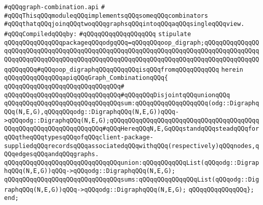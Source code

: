\label{src/lib/graph/graph-combination.api}
\verb|#qQQqgraph-combination.api|\newline
\verb|#|\newline
\verb|#qQQqThisqQQqmoduleqQQqimplementsqQQqsomeqQQqcombinators|\newline
\verb|#qQQqthatqQQqjoinqQQqtwoqQQqgraphsqQQqintoqQQqaqQQqsingleqQQqview.|\newline
\newline
\verb|#qQQqCompiledqQQqby:|\newline
\verb|#qQQqqQQqqQQqqQQqqQQq|\newline
\newline
\newline
\newline
\verb|stipulate|\newline
\verb|qQQqqQQqqQQqqQQqpackageqQQqodgqQQq=qQQqqQQqoop_digraph;qQQqqQQqqQQqqQQqqQQqqQQqqQQqqQQqqQQqqQQqqQQqqQQqqQQqqQQqqQQqqQQqqQQqqQQqqQQqqQQqqQQqqQQqqQQqqQQqqQQqqQQqqQQqqQQqqQQqqQQqqQQqqQQqqQQqqQQqqQQqqQQqqQQqqQQqqQQqqQQqqQQq#qQQqoop_digraphqQQqqQQqqQQqisqQQqfromqQQqqQQqqQQq|\newline
\verb|herein|\newline
\newline
\verb|qQQqqQQqqQQqqQQqapiqQQqGraph_CombinationqQQq{|\newline
\verb|qQQqqQQqqQQqqQQqqQQqqQQqqQQqqQQq#|\newline
\verb|qQQqqQQqqQQqqQQqqQQqqQQqqQQqqQQq#qQQqqQQqDisjointqQQqunionqQQq|\newline
\verb|qQQqqQQqqQQqqQQqqQQqqQQqqQQqqQQqsum:qQQqqQQqqQQqqQQqqQQq(odg::DigraphqQQq(N,E,G),qQQqqQQqodg::DigraphqQQq(N,E,G))qQQq->qQQqodg::DigraphqQQq(N,E,G);qQQqqQQqqQQqqQQqqQQqqQQqqQQqqQQqqQQqqQQqqQQqqQQqqQQqqQQqqQQqqQQqqQQq#qQQqHereqQQqN,E,GqQQqstandqQQqsteadqQQqforqQQqtheqQQqtypesqQQqofqQQqclient-package-suppliedqQQqrecordsqQQqassociatedqQQqwithqQQq(respectively)qQQqnodes,qQQqedgesqQQqandqQQqgraphs.|\newline
\verb|qQQqqQQqqQQqqQQqqQQqqQQqqQQqqQQqunion:qQQqqQQqqQQqList(qQQqodg::DigraphqQQq(N,E,G))qQQq->qQQqodg::DigraphqQQq(N,E,G);|\newline
\verb|qQQqqQQqqQQqqQQqqQQqqQQqqQQqqQQqsums:qQQqqQQqqQQqqQQqList(qQQqodg::DigraphqQQq(N,E,G))qQQq->qQQqodg::DigraphqQQq(N,E,G);|\newline
\newline
\verb|qQQqqQQqqQQqqQQq};|\newline
\verb|end;|\newline

